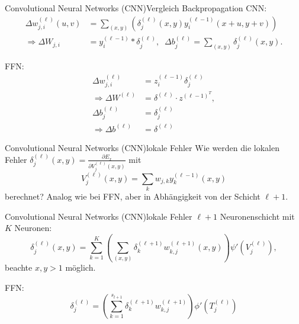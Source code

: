\documentclass[10pt]{beamer} %
\begin{document}
\begin{frame}{Convolutional Neural Networks (CNN)}{Vergleich Backpropagation}
   CNN:
   \begin{align*}
      \label{eq:CNN_K_grad}
      \Delta w_{j,i}^{(\ell)}(u,v)&= \sum_{(x,y)} \left(\delta_j^{(\ell)}(x,y)  y_i^{(\ell-1)}(x+u,y+v)\right) \\
      \Rightarrow \Delta W_{j,i}&= y_i^{(\ell-1)} \ast \delta_j^{(\ell)}, \; \;
     \Delta b_j^{(\ell)}= \sum_{(x,y)} \delta_j^{(\ell)}(x,y).
  \end{align*}

  \pause
  FFN:
  \begin{align*}
   \Delta w^{(\ell)}_{j,i}&= z^{(\ell-1)}_i \delta^{(\ell)}_j\\
   \Rightarrow \Delta W^{(\ell)}&= \delta^{(\ell)} \cdot z^{{(\ell-1)}^T}, \\
   \Delta b^{(\ell)}_{j} &= \delta^{(\ell)}_j \\
   \Rightarrow \Delta b^{(\ell)}&= \delta^{(\ell)}  
\end{align*}

\end{frame}

\begin{frame}{Convolutional Neural Networks (CNN)}{lokale Fehler}
   Wie werden die lokalen Fehler $\delta_j^{(\ell)}(x,y)=\frac{\partial E_x}{\partial V_j^{(\ell)}(x,y)}$ mit 
   \begin{equation*}
      V_j^{(\ell)}(x,y)=\sum_{k} w_{j,k} y_k^{(\ell-1)}(x,y)
   \end{equation*} 
   berechnet? Analog wie bei FFN, aber in Abhängigkeit von der Schicht $\ell+1$.
\end{frame}

\begin{frame}{Convolutional Neural Networks (CNN)}{lokale Fehler}
   $\ell+1$ Neuronenschicht mit $K$ Neuronen:
   \begin{equation*}
      \delta_j^{(\ell)}(x,y)=\sum_{k=1}^{K} \left(\sum_{(x,y)} \delta_k^{(\ell+1)} w_{k,j}^{(\ell+1)}(x,y)\right) \psi'(V_j^{(\ell)}),
  \end{equation*} beachte $x,y >1$ möglich.
  \pause
  
  FFN:
  \begin{equation*}
   \delta_j^{(\ell)}=\left(\sum_{k=1}^{s_{l+1}} \delta^{(\ell+1)}_k w^{(\ell+1)}_{k,j}\right) \phi'(T_j^{(\ell)})
\end{equation*}
\end{frame}
\end{document}
